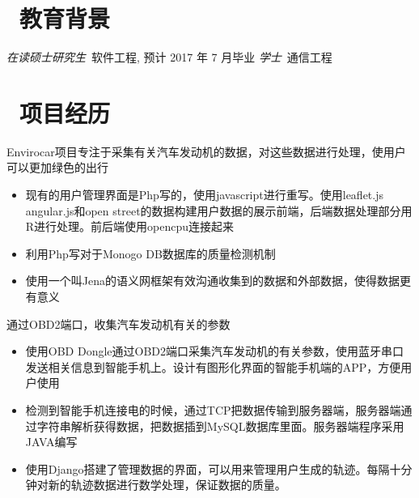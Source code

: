\documentclass{resume}
\begin{document}


 
\section{\faGraduationCap\  教育背景}
\textit{在读硕士研究生}\ 软件工程, 预计 2017 年 7 月毕业
\textit{学士}\ 通信工程

\section{\faUsers\ 项目经历}
Envirocar项目专注于采集有关汽车发动机的数据，对这些数据进行处理，使用户可以更加绿色的出行
\begin{itemize}
  \item 现有的用户管理界面是Php写的，使用javascript进行重写。使用leaflet.js angular.js和open street的数据构建用户数据的展示前端，后端数据处理部分用R进行处理。前后端使用opencpu连接起来
  \item 利用Php写对于Monogo DB数据库的质量检测机制
  \item 使用一个叫Jena的语义网框架有效沟通收集到的数据和外部数据，使得数据更有意义
\end{itemize}

\begin{onehalfspacing}
通过OBD2端口，收集汽车发动机有关的参数
\begin{itemize}
  \item 使用OBD Dongle通过OBD2端口采集汽车发动机的有关参数，使用蓝牙串口发送相关信息到智能手机上。设计有图形化界面的智能手机端的APP，方便用户使用
  \item 检测到智能手机连接电的时候，通过TCP把数据传输到服务器端，服务器端通过字符串解析获得数据，把数据插到MySQL数据库里面。服务器端程序采用JAVA编写
  \item 使用Django搭建了管理数据的界面，可以用来管理用户生成的轨迹。每隔十分钟对新的轨迹数据进行数学处理，保证数据的质量。
\end{itemize}
\end{onehalfspacing}
\end{document}
